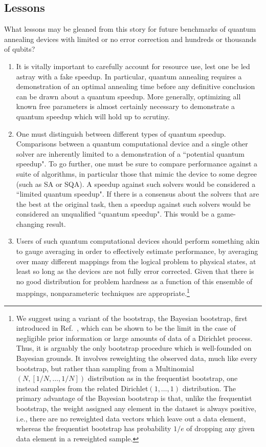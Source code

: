 \subsection{Lessons}
What lessons may be gleaned from this story for future benchmarks of quantum annealing devices with limited or no error correction and hundreds or thousands of qubits?
\begin{enumerate}
	\item It is vitally important to carefully account for resource use, lest one be led astray with a fake speedup. In particular, quantum annealing requires a demonstration of an optimal annealing time before any definitive conclusion can be drawn about a quantum speedup. More generally, optimizing all known free parameters is almost certainly necessary to demonstrate a quantum speedup which will hold up to scrutiny.
	\item One must distinguish between different types of quantum speedup. Comparisons between a quantum computational device and a single other solver are inherently limited to a demonstration of a ``potential quantum speedup". To go further, one must be sure to compare performance against a suite of algorithms, in particular those that mimic the device to some degree (such as SA or SQA). A speedup against such solvers would be considered a ``limited quantum speedup". If there is a consensus about the solvers that are the best at the original task, then a speedup against such solvers would be considered an unqualified ``quantum speedup". This would be a game-changing result.
	\item Users of such quantum computational devices should perform something akin to gauge averaging in order to effectively estimate performance, by averaging over many different mappings from the logical problem to physical states, at least so long as the devices are not fully error corrected. Given that there is no good distribution for problem hardness as a function of this ensemble of mappings, nonparameteric techniques are appropriate.\footnote{We suggest using a variant of the bootstrap, the Bayesian bootstrap, first introduced in Ref.~\cite{rubin1981bayesian}, which can be shown to be the limit in the case of negligible prior information or large amounts of data of a Dirichlet process. Thus, it is arguably the only bootstrap procedure which is well-founded on Bayesian grounds. It involves reweighting the observed data, much like every bootstrap, but rather than sampling from a Multinomial$(N,[1/N,\ldots,1/N])$ distribution as in the frequentist bootstrap, one instead samples from the related Dirichlet$(1,\ldots,1)$ distribution. The primary advantage of the Bayesian bootstrap is that, unlike the frequentist bootstrap, the weight assigned any element in the dataset is always positive, i.e., there are no reweighted data vectors which leave out a data element, whereas the frequentist bootstrap has probability $1/e$ of dropping any given data element in a reweighted sample.}

\end{enumerate}
